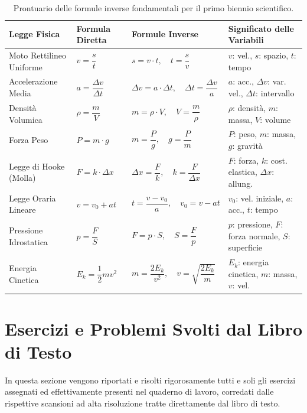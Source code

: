 \documentclass[11pt,a4paper,oneside]{report}
\begin{document}
\begin{table}[htbp]
\centering
\small
\renewcommand{\arraystretch}{1.3}
\begin{tabularx}{\textwidth}{lllX}
\toprule
\textbf{Legge Fisica} & \textbf{Formula Diretta} & \textbf{Formule Inverse} & \textbf{Significato delle Variabili} \\
\midrule
Moto Rettilineo Uniforme & $v = \dfrac{s}{t}$ & $s = v \cdot t, \quad t = \dfrac{s}{v}$ & $v$: vel., $s$: spazio, $t$: tempo \\
Accelerazione Media & $a = \dfrac{\Delta v}{\Delta t}$ & $\Delta v = a \cdot \Delta t, \quad \Delta t = \dfrac{\Delta v}{a}$ & $a$: acc., $\Delta v$: var. vel., $\Delta t$: intervallo \\
Densità Volumica & $\rho = \dfrac{m}{V}$ & $m = \rho \cdot V, \quad V = \dfrac{m}{\rho}$ & $\rho$: densità, $m$: massa, $V$: volume \\
Forza Peso & $P = m \cdot g$ & $m = \dfrac{P}{g}, \quad g = \dfrac{P}{m}$ & $P$: peso, $m$: massa, $g$: gravità \\
Legge di Hooke (Molla) & $F = k \cdot \Delta x$ & $\Delta x = \dfrac{F}{k}, \quad k = \dfrac{F}{\Delta x}$ & $F$: forza, $k$: cost. elastica, $\Delta x$: allung. \\
Legge Oraria Lineare & $v = v_0 + a t$ & $t = \dfrac{v - v_0}{a}, \quad v_0 = v - a t$ & $v_0$: vel. iniziale, $a$: acc., $t$: tempo \\
Pressione Idrostatica & $p = \dfrac{F}{S}$ & $F = p \cdot S, \quad S = \dfrac{F}{p}$ & $p$: pressione, $F$: forza normale, $S$: superficie \\
Energia Cinetica & $E_k = \dfrac{1}{2}m v^2$ & $m = \dfrac{2E_k}{v^2}, \quad v = \sqrt{\dfrac{2E_k}{m}}$ & $E_k$: energia cinetica, $m$: massa, $v$: vel. \\
\bottomrule
\end{tabularx}
\caption{Prontuario delle formule inverse fondamentali per il primo biennio scientifico.}
\label{tab:formule_inverse}
\end{table}

\chapter{Esercizi e Problemi Svolti dal Libro di Testo}

In questa sezione vengono riportati e risolti rigorosamente tutti e soli gli esercizi assegnati ed effettivamente presenti nel quaderno di lavoro, corredati dalle rispettive scansioni ad alta risoluzione tratte direttamente dal libro di testo.
\end{document}
